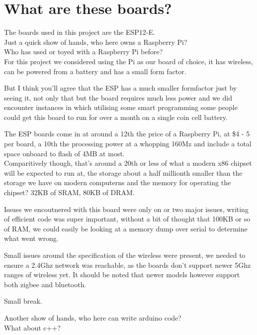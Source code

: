 \documentclass[12pt]{article}
\begin{document}
\section{What are these boards?}
The boards used in this project are the ESP12-E.
\\
Just a quick show of hands, who here owns a Raspberry Pi?
\\
Who has used or toyed with a Raspberry Pi before?
\\
For this project we considered using the Pi as our board of choice,
it has wireless, can be powered from a battery and has a small form factor.
\par\noindent
But I think you'll agree that the ESP has a much smaller formfactor just by seeing it, not only that but the board requires much less power and 
we did encounter instances in which utilising some smart programming 
some people could get this board to run for over a month on a single coin 
cell battery.
\par\noindent
The ESP boards come in at around a 12th the price of a Raspberry Pi, at 
\$4 - 5 per board, a 10th the processing power at a whopping 160Mz 
and include a total space onboard to flash of 4MB at most.
\\
Comparitively though, that's around a 20th or less of what a modern x86 
chipset will be expected to run at, the storage about a half millionth 
smaller than the storage we have on modern computerns and the memory for 
operating the chipset? 32KB of SRAM, 80KB of DRAM.
\\
\par\noindent
Issues we encoutnered with this board were only on or two major issues, 
writing of efficient code was super important, without a bit of thought 
that 100KB or so of RAM, we could easily be looking at a memory dump over 
serial to determine what went wrong. 
\\
\par\noindent
Small issues around the specification of the wireless were present, we 
needed to ensure a 2.4Ghz network was reachable, as the boards don't support 
newer 5Ghz ranges of wireless yet. It should be noted that newer models however 
support both zigbee and bluetooth.
\\
\par\noindent
Small break.
\\
\par\noindent
Another show of hands, who here can write arduino code? 
\\
What about c++?
\\
\end{document}
